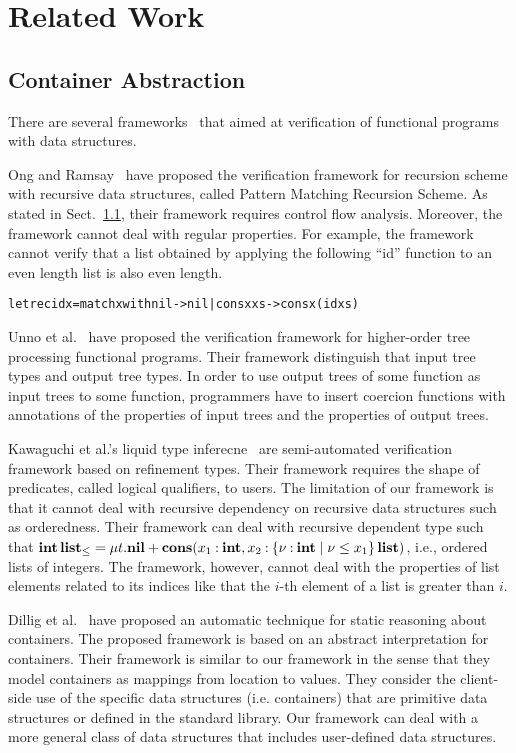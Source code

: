 \section{Related Work}
\label{sec:related}

\subsection{Container Abstraction}
There are several
frameworks~\cite{Kawaguchi2009,Chin2003,Unno2010,Ong2011} that aimed at
verification of functional programs with data structures.

Ong and Ramsay~\cite{Ong2011} have proposed the verification framework
for recursion scheme with recursive data structures, called Pattern
Matching Recursion Scheme.  As stated in Sect.~\ref{}, their framework
requires control flow analysis. Moreover, the framework cannot deal with
regular properties. For example, the framework cannot verify that a list
obtained by applying the following ``id'' function to an even length
list is also even length.
\begin{alltt}
let rec id x = match x with nil -> nil | cons x xs -> cons x (id xs)
\end{alltt}

Unno et al.~\cite{Unno2010} have proposed the verification framework for higher-order
tree processing functional programs. Their framework distinguish that
input tree types and output tree types.  In order to use output trees of
some function as input trees to some function, programmers have to
insert coercion functions with annotations of the properties of input
trees and the properties of output trees.

Kawaguchi et al.'s liquid type inferecne~\cite{Kawaguchi2009} are
semi-automated verification framework based on refinement types.  Their
framework requires the shape of predicates, called logical qualifiers,
to users.  The limitation of our framework is that it cannot deal with
recursive dependency on recursive data structures such as
orderedness.  Their framework can deal with recursive dependent type
such that ${\mathbf{int}}\,{\mathbf{list}_\leq} = \mu t.\mathbf{nil} +
\mathbf{cons}({x_1\mathbin{:}\mathbf{int}},{x_2\mathbin{:}{\{\nu\mathbin{:}\mathbf{int} \mid \nu \leq
x_1\}}\,{\mathbf{list}}})$, i.e., ordered lists of integers.  The framework,
however, cannot deal with the properties of list elements related to its
indices like that the $i$-th element of a list is greater than $i$.

Dillig et al.~\cite{Dillig2011} have proposed an automatic technique for
static reasoning about containers.  The proposed framework is based on
an abstract interpretation for containers.  Their framework is similar
to our framework in the sense that they model containers as mappings
from location to values.  They consider the client-side use of the
specific data structures (i.e. containers) that are primitive data
structures or defined in the standard library.  Our framework can deal with a
more general class of data structures that includes user-defined data
structures.

